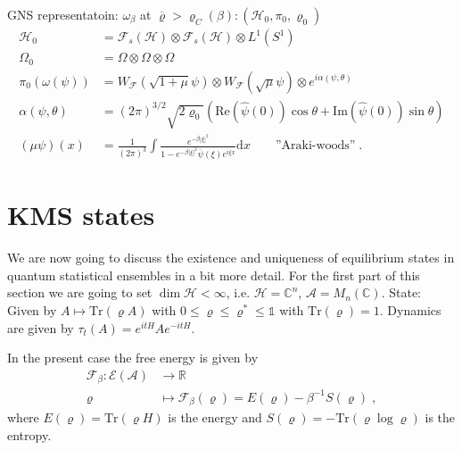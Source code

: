 \documentclass[
a4paper, %
11pt, %
onecolumn, %
openany, %
]{memoir}
\theoremstyle{definition}
\theoremstyle{remark}
\theoremstyle{plain}
\begin{document}
GNS representatoin: $\omega_{\beta}$ at $\overline{\varrho}>\varrho_C(\beta):(\mathcal{H}_0,\pi_0,\varrho_0)$ \begin{align}
\mathcal{H}_0&=\mathcal{F}_s(\mathcal{H})\otimes \mathcal{F}_s(\mathcal{H})\otimes L^1(S^1)\\
\Omega_0&=\Omega\otimes\Omega\otimes\Omega\\
\pi_0(\omega(\psi))&=W_{\mathcal{F}}(\sqrt{1+\mu}\psi)\otimes W_{\mathcal{F}}(\sqrt{\mu}\psi)\otimes e^{i\alpha(\psi,\theta)}\\ \alpha(\psi,\theta)&=(2\pi)^{3/2}\sqrt{2\varrho_0} \left(\mathrm{Re}(\hat{\psi}(0))\cos\theta+\mathrm{Im}(\hat{\psi}(0))\sin\theta\right)\\
(\mu\psi)(x)&=\frac{1}{(2\pi)^3}\int\frac{e^{-\beta|\xi|^2}}{1-e^{-\beta|\xi|^2}\overline{\psi}(\xi)e^{i\xi x}}\mathrm{d}x \qquad \text{''Araki-woods''}\;.
\end{align}
 \section{KMS states}
 We are now going to discuss the existence and uniqueness of equilibrium states in quantum statistical ensembles in a bit more detail. For the first part of this section we are going to set $\dim\mathcal{H}<\infty$, i.e. $\mathcal{H}=\mathbb{C}^n$, $\mathcal{A}=M_n(\mathbb{C})$. State: Given by $A\mapsto\mathrm{Tr}(\varrho A)$ with $0\leq \varrho\leq \varrho^*\leq \mathds{1}$ with $\mathrm{Tr}(\varrho)=1$. Dynamics are given by $\tau_t(A)=e^{itH}Ae^{-itH}$.\\
 {\centering{}\par}
 In the present case the free energy is given by \begin{align}
 \mathcal{F}_{\beta}:\mathcal{E}(\mathcal{A})&\longrightarrow \mathbb{R}\\
 \varrho &\longmapsto \mathcal{F}_{\beta}(\varrho)=E(\varrho)-\beta^{-1}S(\varrho)\;,
 \end{align}
 where $E(\varrho)=\mathrm{Tr}(\varrho H)$ is the energy and
 $S(\varrho)=-\mathrm{Tr}(\varrho\log\varrho)$ is the entropy.
\end{document}
